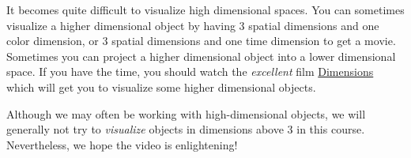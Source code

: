 \documentclass{ximera}
\begin{document}
It becomes quite difficult to visualize high dimensional spaces.  You
can sometimes visualize a higher dimensional object by having $3$
spatial dimensions and one color dimension, or $3$ spatial dimensions
and one time dimension to get a movie.  Sometimes you can project a
higher dimensional object into a lower dimensional space.  If you have
the time, you should watch the \textit{excellent} film
\href{http://www.dimensions-math.org/}{Dimensions} which will get you
to visualize some higher dimensional objects.


Although we may often be working with high-dimensional objects, we
will generally not try to \textit{visualize} objects in dimensions
above $3$ in this course.  Nevertheless, we hope the video is
enlightening!
\end{document}
